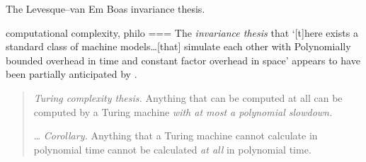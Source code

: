 The Levesque–van Em Boas invariance thesis.

computational complexity, philo
===
The \emph{invariance thesis} \parencites[see][§ 1.3.1]{arora2009}[§ 2.2]{dean2021}[§ 1]{vanemdeboas1991}[§ 1]{levesque1988} that ‘[t]here exists a standard class of machine models…[that] simulate each other with Polynomially bounded overhead in time and constant factor overhead in space’ appears to have been partially anticipated by \textcite[§ 3]{levesque1988}.
\begin{quote}
	\emph{Turing complexity thesis.} Anything that can be computed at all can be computed by a Turing machine \emph{with at most a polynomial slowdown.}
	
	\ldots{} \emph{Corollary.} Anything that a Turing machine cannot calculate in polynomial time cannot be calculated \emph{at all} in polynomial time.
\end{quote}

